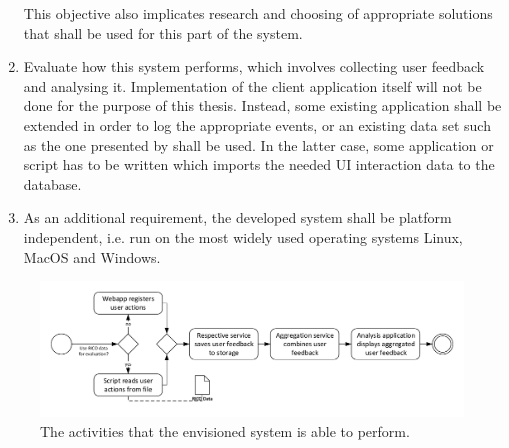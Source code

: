 \begin{enumerate}
This objective also implicates research and choosing of appropriate solutions that shall be used for this part of the system.
\item Evaluate how this system performs, which involves collecting user feedback and analysing it.
Implementation of the client application itself will not be done for the purpose of this thesis.
Instead, some existing application shall be extended in order to log the appropriate events, or an existing data set such as the one presented by \citet{Deka:2017:Rico} shall be used.
In the latter case, some application or script has to be written which imports the needed UI interaction data to the database.
\item As an additional requirement, the developed system shall be platform independent, i.e. run on the most widely used operating systems Linux, MacOS and Windows.
\end{enumerate}

\begin{figure}[htb]
        \includegraphics[width=1.1\textwidth]{gfx/architecture-3}
        \caption{The activities that the envisioned system is able to perform.}
        \label{fig:system:vision}
\end{figure}
